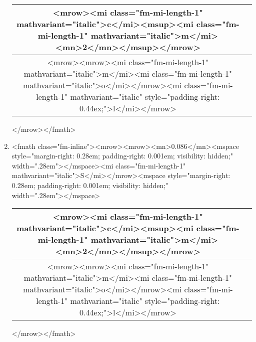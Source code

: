 \documentclass{article}
\begin{document}
\begin{enumerate}[label=(\alph*)]
\begin{tabular}{|c|c|}
\hline
<mrow><mi class="fm-mi-length-1" mathvariant="italic">c</mi><msup><mi class="fm-mi-length-1" mathvariant="italic">m</mi><mn>2</mn></msup></mrow> \\
\hline
<mrow><mrow><mi class="fm-mi-length-1" mathvariant="italic">m</mi><mi class="fm-mi-length-1" mathvariant="italic">o</mi></mrow><mi class="fm-mi-length-1" mathvariant="italic" style="padding-right: 0.44ex;">l</mi></mrow> \\
\hline
\end{tabular}
</mrow></fmath>
\item  <fmath class="fm-inline"><mrow><mrow><mn>0.086</mn><mspace style="margin-right: 0.28em; padding-right: 0.001em; visibility: hidden;" width=".28em">‌</mspace><mi class="fm-mi-length-1" mathvariant="italic">S</mi></mrow><mspace style="margin-right: 0.28em; padding-right: 0.001em; visibility: hidden;" width=".28em">‌</mspace>\begin{tabular}{|c|c|}
\hline
<mrow><mi class="fm-mi-length-1" mathvariant="italic">c</mi><msup><mi class="fm-mi-length-1" mathvariant="italic">m</mi><mn>2</mn></msup></mrow> \\
\hline
<mrow><mrow><mi class="fm-mi-length-1" mathvariant="italic">m</mi><mi class="fm-mi-length-1" mathvariant="italic">o</mi></mrow><mi class="fm-mi-length-1" mathvariant="italic" style="padding-right: 0.44ex;">l</mi></mrow> \\
\hline
\end{tabular}
</mrow></fmath>
\end{enumerate}
\newpage
\end{document}

